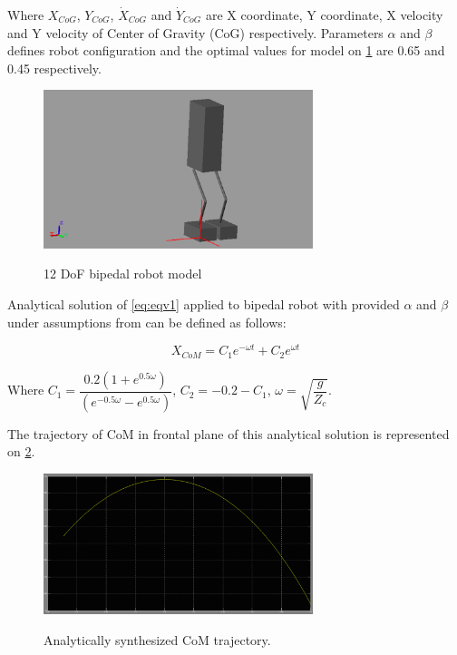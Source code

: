 \documentclass[12pt,a4paper]{report}
\begin{document}
		Where $X_{CoG}$, $Y_{CoG}$, $\dot{X}_{CoG}$ and $\dot{Y}_{CoG}$ are X coordinate, Y coordinate, X velocity and Y velocity of Center of Gravity (CoG) respectively. Parameters $\alpha$ and $\beta$ defines robot configuration and the optimal values for model on \cref{fig:21} are 0.65 and 0.45 respectively.
		
		\begin{figure}[H]
			\vspace{-0.2cm}
			\centering
			{\includegraphics[width=0.7\textwidth]{21}}
			\caption{12 DoF bipedal robot model}
			\label{fig:21}
			\vspace{-0.1cm}
		\end{figure} 
		
		Analytical solution of \ref{eq:eqv1} applied to bipedal robot with provided $\alpha$ and $\beta$ under assumptions from \cite{ha2007effective} can be defined as follows:
		
		\begin{equation}
			X_{CoM} = C_1 e^{-\omega t} + C_2 e^{\omega t}
		\end{equation}
		
		Where $C_1 = \dfrac{0.2(1+e^{0.5\omega })}{(e^{-0.5\omega }-e^{0.5\omega })}$, $C_2=-0.2-C_1$, $\omega = \sqrt{\dfrac{g}{Z_c}}$.
		
		The trajectory of CoM in frontal plane of this analytical solution is represented on \cref{fig:24}.
		
		\begin{figure}[H]
			\vspace{-0.2cm}
			\centering
			{\includegraphics[width=0.7\textwidth]{24}}
			\caption{Analytically synthesized CoM trajectory.}
			\label{fig:24}
			\vspace{-0.1cm}
		\end{figure}
		
\end{document}
